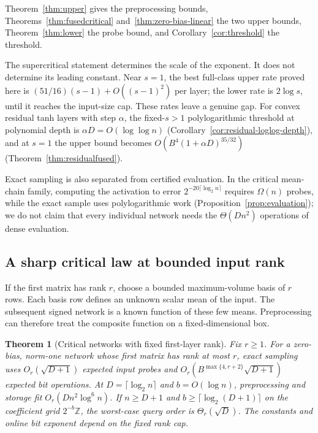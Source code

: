 \documentclass[11pt]{article}
\newtheorem{theorem}{Theorem}[section]
\theoremstyle{definition}
\theoremstyle{remark}
\numberwithin{equation}{section}
\begin{document}
Theorem~\ref{thm:upper} gives the preprocessing bounds,
Theorems~\ref{thm:fusedcritical} and~\ref{thm:zero-bias-linear}
the two upper bounds, Theorem~\ref{thm:lower} the probe bound, and
Corollary~\ref{cor:threshold} the threshold.

The supercritical statement determines the scale of the exponent.
It does not determine its leading constant. Near $s=1$, the best
full-class upper rate proved here is
$(51/16)(s-1)+O((s-1)^2)$ per layer; the lower rate is $2\log s$,
until it reaches the input-size cap. These rates leave a genuine gap.
For convex residual tanh layers with step $\alpha$, the fixed-$s>1$
polylogarithmic threshold at polynomial depth is
$\alpha D=O(\log\log n)$ (Corollary~\ref{cor:residual-loglog-depth}),
and at $s=1$ the upper bound becomes $O(B^4(1+\alpha D)^{35/32})$
(Theorem~\ref{thm:residualfused}).

Exact sampling is also separated from certified evaluation. In the
critical mean-chain family, computing the activation to error
$2^{-20\lceil\log_2n\rceil}$ requires $\Omega(n)$ probes, while the
exact sample uses polylogarithmic work
(Proposition~\ref{prop:evaluation}); we do not claim that every
individual network needs the $\Theta(Dn^2)$ operations of dense
evaluation.



\subsection{A sharp critical law at bounded input rank}

If the first matrix has rank $r$, choose a bounded maximum-volume
basis of $r$ rows. Each basis row defines an unknown scalar mean of the input.
The subsequent signed network is a known function of these few
means. Preprocessing can therefore treat the composite function
on a fixed-dimensional box.

\begin{theorem}[Critical networks with fixed first-layer rank]
\label{thm:main-bottleneck}
Fix $r\ge1$. For a zero-bias, norm-one network whose first matrix
has rank at most $r$, exact sampling uses $O_r(\sqrt{D+1})$
expected input probes and
$O_r(B^{\max\{4,r+2\}}\sqrt{D+1})$ expected bit operations. At
$D=\lceil\log_2n\rceil$ and $b=O(\log n)$, preprocessing
and storage fit $O_r(Dn^2\log^6n)$.
If $n\ge D+1$ and $b\ge\lceil\log_2(D+1)\rceil$ on the
coefficient grid $2^{-b}\mathbb Z$, the worst-case query order
is $\Theta_r(\sqrt D)$. The constants and online bit exponent
depend on the fixed rank cap.
\end{theorem}
\end{document}
